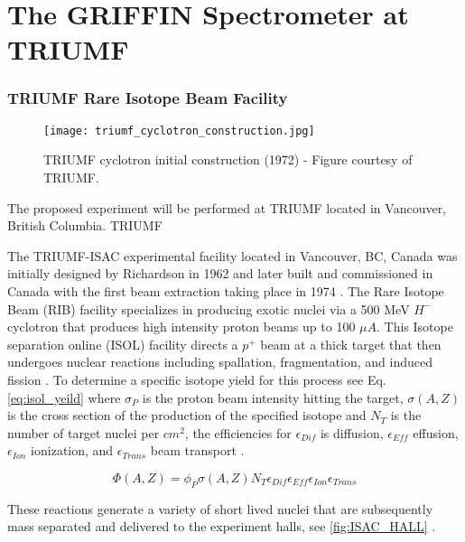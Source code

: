 \documentclass[cnatzke_thesis_proposal.tex]{subfiles}
\begin{document}
\chapter{The GRIFFIN Spectrometer at TRIUMF}

\subsection{TRIUMF Rare Isotope Beam Facility}
\begin{figure}[H]
  \begin{center}
    \texttt{[image: triumf\_cyclotron\_construction.jpg]}
  \end{center}
  \caption{TRIUMF cyclotron initial construction (1972) - Figure courtesy of TRIUMF.}
  \label{fig:TRIUMF_CYCLOTRON}
\end{figure}

The proposed experiment will be performed at TRIUMF located in Vancouver, British Columbia. TRIUMF 


The TRIUMF-ISAC experimental facility located in Vancouver, BC, Canada was initially designed by Richardson in 1962 and later built and commissioned in Canada with the first beam extraction taking place in 1974 \cite{Bylinskii2014}. The Rare Isotope Beam (RIB) facility specializes in producing exotic nuclei via a 500 MeV $H^{-}$ cyclotron that produces high intensity proton beams up to 100 $\mu A$.  This Isotope separation online (ISOL) facility directs a $p^+$ beam at a thick target that then undergoes nuclear reactions including spallation, fragmentation, and induced fission \cite{Bricault2014}.  To determine a specific isotope yield for this process see Eq.\ref{eq:isol_yeild} where $\sigma_P$ is the proton beam intensity hitting the target, $\sigma(A, Z)$ is the cross section of the production of the specified isotope and $N_T$ is the number of target nuclei per $cm^2$, the efficiencies for $\epsilon_{Dif}$ is diffusion, $\epsilon_{Eff}$ effusion,  $\epsilon_{Ion}$ ionization, and $\epsilon_{Trans}$ beam transport \cite{Bricault2014}.

\begin{equation}
  \Phi(A,Z) = \phi_P \sigma(A,Z) N_T \epsilon_{Dif} \epsilon_{Eff} \epsilon_{Ion} \epsilon_{Trans}
  \label{eq:isol_yeild}
\end{equation}

These reactions generate a variety of short lived nuclei that are subsequently mass separated and delivered to the experiment halls, see \ref{fig:ISAC_HALL} \cite{Dombsky2014}.
\end{document}
